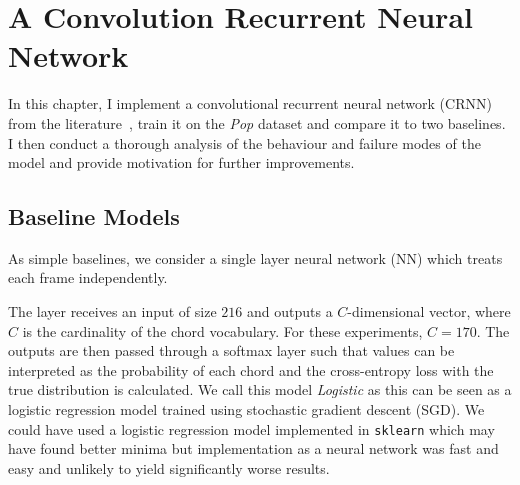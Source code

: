 \chapter{A Convolution Recurrent Neural Network}

In this chapter, I implement a convolutional recurrent neural network (CRNN) from the literature~\citep{StructuredTraining}, train it on the \emph{Pop} dataset and compare it to two baselines. I then conduct a thorough analysis of the behaviour and failure modes of the model and provide motivation for further improvements. 

\section{Baseline Models}

As simple baselines, we consider a single layer neural network (NN) which treats each frame independently. 

The layer receives an input of size $216$ and outputs a $C$-dimensional vector, where $C$ is the cardinality of the chord vocabulary. For these experiments, $C=170$. The outputs are then passed through a softmax layer such that values can be interpreted as the probability of each chord and the cross-entropy loss with the true distribution is calculated. We call this model \emph{Logistic} as this can be seen as a logistic regression model trained using stochastic gradient descent (SGD). We could have used a logistic regression model implemented in \texttt{sklearn} which may have found better minima but implementation as a neural network was fast and easy and unlikely to yield significantly worse results.


